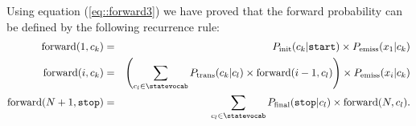  Using equation (\ref{eq::forward3}) we have proved that  the forward probability can be defined by the
following recurrence rule: 
\begin{eqnarray}
\mathrm{forward}(1, c_k)&=& P_{\mathrm{init}}(c_k|\text{\tt start}) \times 
P_{\mathrm{emiss}}(x_1 | c_k)
 \\
 \mathrm{forward}(i, c_k) &=& \left( \displaystyle \sum_{c_l \in \statevocab} P_{\mathrm{trans}}(c_k | c_l) \times \mathrm{forward}(i-1, c_l) \right) \times P_{\mathrm{emiss}}(x_i | c_k)  \label{forwardRecursion}
 \\
  \mathrm{forward}(N+1, \text{\tt stop}) &=& \sum_{c_l \in \statevocab} P_{\mathrm{final}}(\text{\tt stop} | c_l) \times \mathrm{forward}(N, c_l).
\end{eqnarray}

%
%


